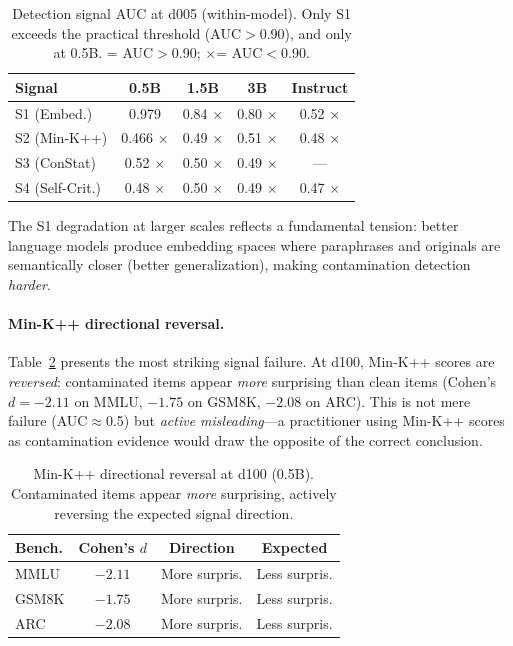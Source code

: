 \documentclass[11pt,a4paper]{article}
\newcommand{\cmark}{\checkmark}
\newcommand{\xmark}{$\times$}
\begin{document}
\begin{table}[t]
\centering
\small
\caption{Detection signal AUC at d005 (within-model). Only S1 exceeds the practical threshold (AUC$>$0.90), and only at 0.5B. \cmark = AUC$>$0.90; \xmark = AUC$<$0.90.}
\label{tab:signal-auc}
\begin{tabular}{lcccc}
\toprule
\textbf{Signal} & \textbf{0.5B} & \textbf{1.5B} & \textbf{3B} & \textbf{Instruct} \\
\midrule
S1 (Embed.) & 0.979 \cmark & 0.84 \xmark & 0.80 \xmark & 0.52 \xmark \\
S2 (Min-K++) & 0.466 \xmark & 0.49 \xmark & 0.51 \xmark & 0.48 \xmark \\
S3 (ConStat) & 0.52 \xmark & 0.50 \xmark & 0.49 \xmark & --- \\
S4 (Self-Crit.) & 0.48 \xmark & 0.50 \xmark & 0.49 \xmark & 0.47 \xmark \\
\bottomrule
\end{tabular}
\end{table}

The S1 degradation at larger scales reflects a fundamental tension: better language models produce embedding spaces where paraphrases and originals are semantically closer (better generalization), making contamination detection \emph{harder}.

\paragraph{Min-K++ directional reversal.}
Table~\ref{tab:minkpp-reversal} presents the most striking signal failure.
At d100, Min-K++ scores are \emph{reversed}: contaminated items appear \emph{more} surprising than clean items (Cohen's $d=-2.11$ on MMLU, $-1.75$ on GSM8K, $-2.08$ on ARC).
This is not mere failure (AUC$\approx$0.5) but \emph{active misleading}---a practitioner using Min-K++ scores as contamination evidence would draw the opposite of the correct conclusion.

\begin{table}[t]
\centering
\small
\caption{Min-K++ directional reversal at d100 (0.5B). Contaminated items appear \emph{more} surprising, actively reversing the expected signal direction.}
\label{tab:minkpp-reversal}
\begin{tabular}{lccc}
\toprule
\textbf{Bench.} & \textbf{Cohen's $d$} & \textbf{Direction} & \textbf{Expected} \\
\midrule
MMLU & $-2.11$ & More surpris. & Less surpris. \\
GSM8K & $-1.75$ & More surpris. & Less surpris. \\
ARC & $-2.08$ & More surpris. & Less surpris. \\
\bottomrule
\end{tabular}
\end{table}
\end{document}

